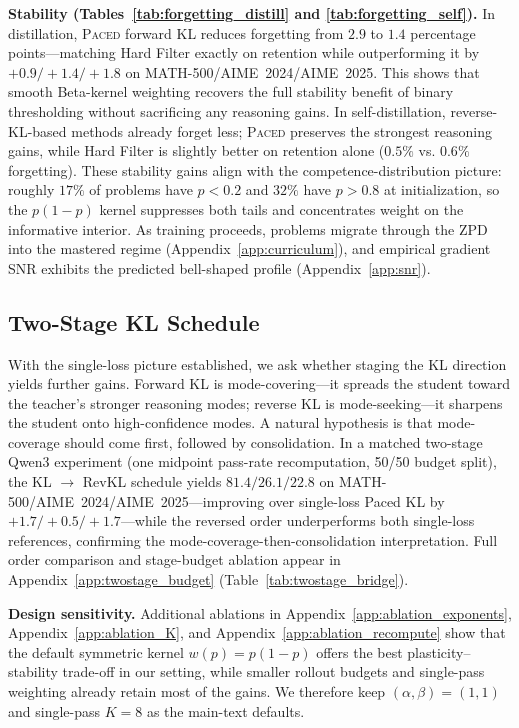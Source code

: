 \documentclass{article}
\begin{document}
\textbf{Stability (Tables~\ref{tab:forgetting_distill} and \ref{tab:forgetting_self}).}
In distillation, \textsc{Paced} forward KL reduces forgetting from $2.9$ to $1.4$ percentage points---matching Hard Filter exactly on retention while outperforming it by $+0.9/+1.4/+1.8$ on MATH-500/AIME~2024/AIME~2025. This shows that smooth Beta-kernel weighting recovers the full stability benefit of binary thresholding without sacrificing any reasoning gains. In self-distillation, reverse-KL-based methods already forget less; \textsc{Paced} preserves the strongest reasoning gains, while Hard Filter is slightly better on retention alone ($0.5\%$ vs. $0.6\%$ forgetting). These stability gains align with the competence-distribution picture: roughly $17\%$ of problems have $p<0.2$ and $32\%$ have $p>0.8$ at initialization, so the $p(1{-}p)$ kernel suppresses both tails and concentrates weight on the informative interior. As training proceeds, problems migrate through the ZPD into the mastered regime (Appendix~\ref{app:curriculum}), and empirical gradient SNR exhibits the predicted bell-shaped profile (Appendix~\ref{app:snr}).

\subsection{Two-Stage KL Schedule}
\label{sec:twostage}
With the single-loss picture established, we ask whether staging the KL direction yields further gains.
Forward KL is mode-covering---it spreads the student toward the teacher's stronger reasoning modes; reverse KL is mode-seeking---it sharpens the student onto high-confidence modes.
A natural hypothesis is that mode-coverage should come first, followed by consolidation.
In a matched two-stage Qwen3 experiment (one midpoint pass-rate recomputation, 50/50 budget split), the KL $\to$ RevKL schedule yields $\mathbf{81.4/26.1/22.8}$ on MATH-500/AIME~2024/AIME~2025---improving over single-loss Paced KL by $+1.7/+0.5/+1.7$---while the reversed order underperforms both single-loss references, confirming the mode-coverage-then-consolidation interpretation.
Full order comparison and stage-budget ablation appear in Appendix~\ref{app:twostage_budget} (Table~\ref{tab:twostage_bridge}).

\textbf{Design sensitivity.} Additional ablations in Appendix~\ref{app:ablation_exponents}, Appendix~\ref{app:ablation_K}, and Appendix~\ref{app:ablation_recompute} show that the default symmetric kernel $w(p)=p(1-p)$ offers the best plasticity--stability trade-off in our setting, while smaller rollout budgets and single-pass weighting already retain most of the gains. We therefore keep $(\alpha,\beta)=(1,1)$ and single-pass $K{=}8$ as the main-text defaults.
\end{document}

